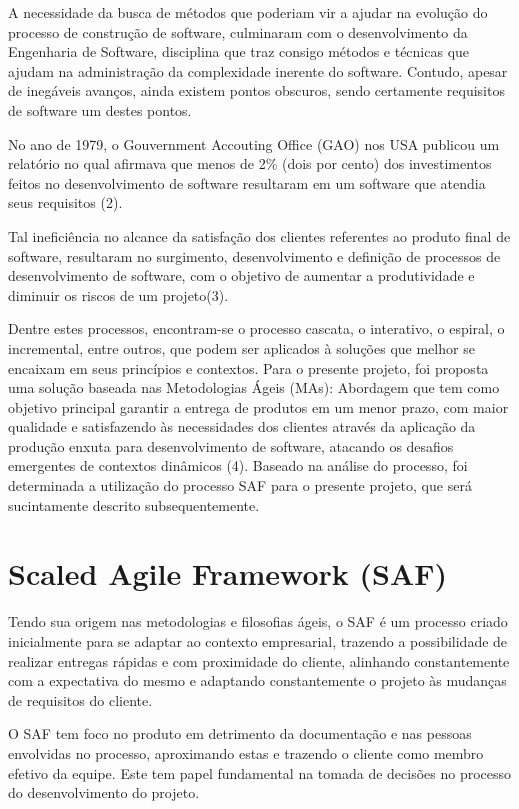A necessidade da busca de métodos que poderiam vir a ajudar na evolução do processo de construção de software, culminaram com o desenvolvimento da Engenharia de Software, disciplina que traz consigo métodos e técnicas que ajudam na administração da complexidade inerente do software. Contudo, apesar de inegáveis avanços, ainda existem pontos obscuros, sendo certamente requisitos de software um destes pontos.

No ano de 1979, o Gouvernment Accouting Office (GAO) nos USA publicou um relatório no qual afirmava que menos de 2\% (dois por cento) dos investimentos feitos no desenvolvimento de software resultaram em um software que atendia seus requisitos (2).

Tal ineficiência no alcance da satisfação dos clientes referentes ao produto final de software, resultaram no surgimento, desenvolvimento e definição de processos de desenvolvimento de software, com o objetivo de aumentar a produtividade e diminuir os riscos de um projeto(3).

Dentre estes processos, encontram-se o processo cascata, o interativo, o espiral, o incremental, entre outros, que podem ser aplicados à soluções que melhor se encaixam em seus princípios e contextos. Para o presente projeto, foi proposta uma solução baseada nas Metodologias Ágeis (MAs): Abordagem que tem como objetivo principal garantir a entrega de produtos em um menor prazo, com maior qualidade e satisfazendo às necessidades dos clientes através da aplicação da produção enxuta para desenvolvimento de software, atacando os desafios emergentes de contextos dinâmicos (4). Baseado na análise do processo, foi determinada a utilização do processo SAF para o presente projeto, que será sucintamente descrito subsequentemente.

\section {Scaled Agile Framework (SAF)}

Tendo sua origem nas metodologias e filosofias ágeis, o SAF é um processo criado inicialmente para se adaptar ao contexto empresarial, trazendo a possibilidade de realizar entregas rápidas e com proximidade do cliente, alinhando constantemente com a expectativa do mesmo e adaptando constantemente o projeto às mudanças de requisitos do cliente.

O SAF tem foco  no produto em detrimento da documentação e nas pessoas envolvidas no processo, aproximando estas e trazendo o cliente como membro efetivo da equipe. Este tem papel fundamental na tomada de decisões no processo do desenvolvimento do projeto.

